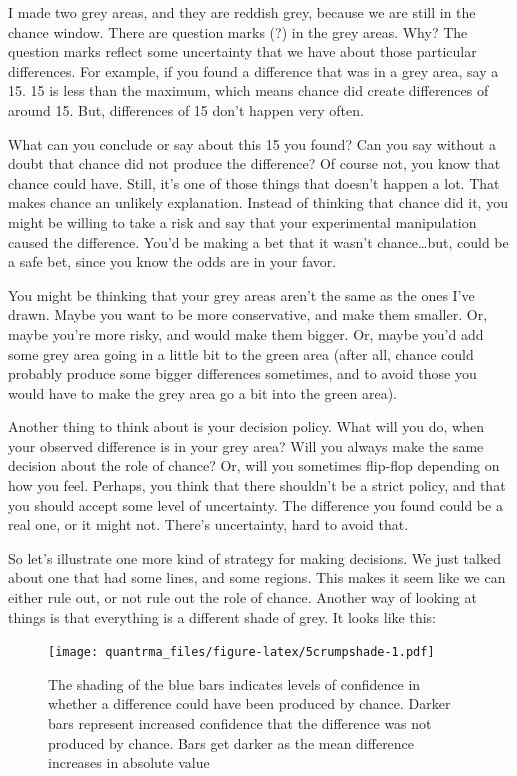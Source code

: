 \documentclass[
]{book}
\begin{document}
I made two grey areas, and they are reddish grey, because we are still in the chance window. There are question marks (?) in the grey areas. Why? The question marks reflect some uncertainty that we have about those particular differences. For example, if you found a difference that was in a grey area, say a 15. 15 is less than the maximum, which means chance did create differences of around 15. But, differences of 15 don't happen very often.

What can you conclude or say about this 15 you found? Can you say without a doubt that chance did not produce the difference? Of course not, you know that chance could have. Still, it's one of those things that doesn't happen a lot. That makes chance an unlikely explanation. Instead of thinking that chance did it, you might be willing to take a risk and say that your experimental manipulation caused the difference. You'd be making a bet that it wasn't chance\ldots but, could be a safe bet, since you know the odds are in your favor.

You might be thinking that your grey areas aren't the same as the ones I've drawn. Maybe you want to be more conservative, and make them smaller. Or, maybe you're more risky, and would make them bigger. Or, maybe you'd add some grey area going in a little bit to the green area (after all, chance could probably produce some bigger differences sometimes, and to avoid those you would have to make the grey area go a bit into the green area).

Another thing to think about is your decision policy. What will you do, when your observed difference is in your grey area? Will you always make the same decision about the role of chance? Or, will you sometimes flip-flop depending on how you feel. Perhaps, you think that there shouldn't be a strict policy, and that you should accept some level of uncertainty. The difference you found could be a real one, or it might not. There's uncertainty, hard to avoid that.

So let's illustrate one more kind of strategy for making decisions. We just talked about one that had some lines, and some regions. This makes it seem like we can either rule out, or not rule out the role of chance. Another way of looking at things is that everything is a different shade of grey. It looks like this:

\begin{figure}
\centering
\texttt{[image: quantrma\_files/figure-latex/5crumpshade-1.pdf]}
\caption{\label{fig:5crumpshade}The shading of the blue bars indicates levels of confidence in whether a difference could have been produced by chance. Darker bars represent increased confidence that the difference was not produced by chance. Bars get darker as the mean difference increases in absolute value}
\end{figure}
\end{document}
